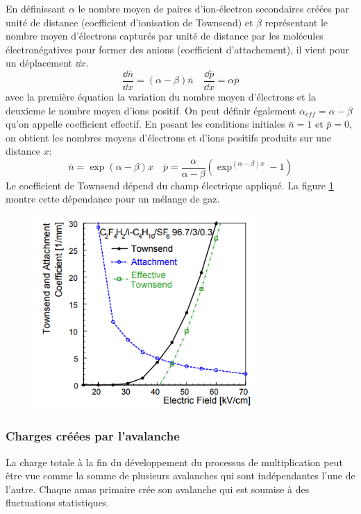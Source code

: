 En définissant $\alpha$ le nombre moyen de paires d'ion-électron secondaires créées par unité de distance (coefficient d'ionisation de Townsend) et  $\beta$ représentant le nombre moyen d'électrons capturés par unité de distance par les molécules électronégatives pour former des anions (coefficient d'attachement), il vient pour un déplacement  $\dd x$.
\begin{equation}
	\frac{\dd \bar{n}}{\dd x}=(\alpha-\beta)\bar{n} \quad  \frac{\dd \bar{p}}{\dd x}=\alpha\bar{p} 
\end{equation}
avec la première équation la variation du nombre moyen d'électrons et la deuxieme le nombre moyen d'ions positif. On peut définir également $\alpha_{eff}=\alpha-\beta$ qu'on appelle coefficient effectif. En posant les conditions initiales $\bar{n}=1$ et $\bar{p}=0$, on obtient les nombres moyens d'électrons et d'ions positifs produits sur une distance $x$: 
\begin{equation}
\bar{n}=\exp(\alpha-\beta)x \quad \bar{p}=\frac{\alpha}{\alpha-\beta}\left(\exp^{(\alpha-\beta)x}-1\right)
\end{equation}
Le coefficient de Townsend dépend du champ électrique appliqué. La figure \ref{tow} montre cette dépendance pour un mélange de gaz.
\begin{figure}[h!]
	\centering
	\includegraphics[width=0.75\textwidth]{RPC/tow.png}
	\label{tow}
\end{figure}


\subsubsection{Charges créées par l'avalanche}
La charge totale à la fin du développement du processus de multiplication peut être vue comme la somme de plusieurs avalanches qui sont indépendantes l'une de l'autre. Chaque amas primaire crée son avalanche qui est soumise à des fluctuations statistiques.

